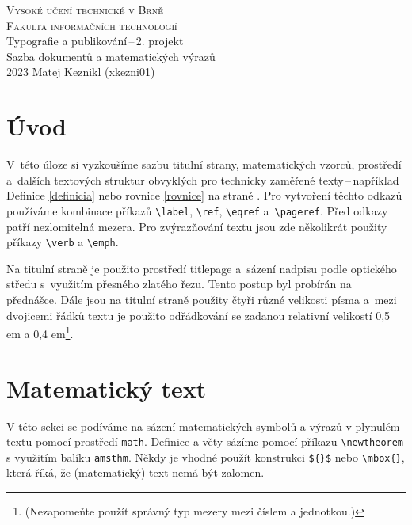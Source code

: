 \documentclass[a4paper, twocolumn, 11pt]{article}
\begin{document}
\begin{titlepage}
    \begin{center}
        {\Huge\textsc{Vysoké učení technické v Brně \\[0.5em]}}
        {\huge\textsc{Fakulta informačních technologií}}\\
        {\LARGE Typografie a publikování\,--\,2. projekt \\[0.4em]
        Sazba dokumentů a matematických výrazů}\\
        {\Large 2023 \hfill Matej Keznikl (xkezni01)}
    \end{center}
\end{titlepage}



\section*{Úvod}

V~této úloze si vyzkoušíme sazbu titulní strany, matematických vzorců, prostředí a~dalších textových struktur obvyklých pro technicky zaměřené texty\,--\,například Definice \ref{definicia} nebo rovnice \eqref{rovnice} na straně \pageref{definicia}. Pro vytvoření těchto odkazů používáme kombinace příkazů \verb|\label|, \verb|\ref|, \verb|\eqref| a~\verb|\pageref|. Před odkazy patří nezlomitelná mezera. Pro zvýrazňování textu jsou zde několikrát použity příkazy \verb|\verb| a \verb|\emph|. 

Na titulní straně je použito prostředí titlepage a~sázení nadpisu podle optického středu s~využitím přesného zlatého řezu. Tento postup byl probírán na přednášce. Dále jsou na titulní straně použity čtyři různé velikosti písma a~mezi dvojicemi řádků textu je použito odřádkování se zadanou relativní velikostí 0,5 em a 0,4 em\footnote[1]{(Nezapomeňte použít správný typ mezery mezi číslem a jednotkou.)}.

\section{Matematický text}
V této sekci se podíváme na sázení matematických symbolů a výrazů v plynulém textu pomocí prostředí \verb|math|. Definice a věty sázíme pomocí příkazu  \verb|\newtheorem| s využitím balíku \verb|amsthm|. Někdy je vhodné použít konstrukci \verb|${}$| nebo 
\verb|\mbox{}|, která říká, že (matematický) text nemá být zalomen. 
\end{document}
